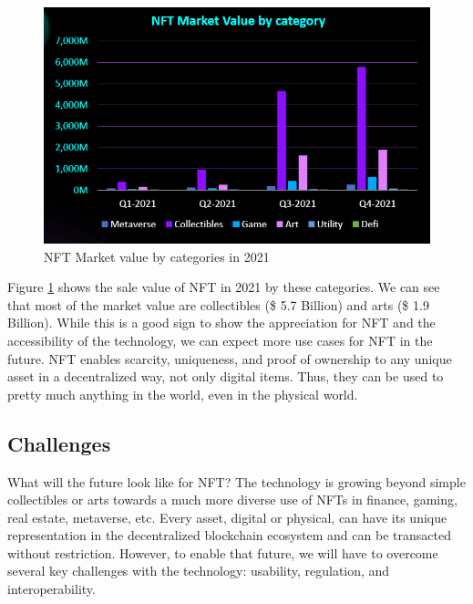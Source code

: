 \documentclass[12pt]{article}
\begin{document}
\begin{figure}[ht]
\label{fig:nftsale}
\includegraphics[width=14cm]{img/nftchart.png}
\centering
\caption{NFT Market value by categories in 2021 \cite{nftsale}}
\end{figure}

Figure \ref{fig:nftsale} shows the sale value of NFT in 2021 by these categories. We can see that most of the market value are collectibles (\$ 5.7 Billion) and arts (\$ 1.9 Billion). While this is a good sign to show the appreciation for NFT and the accessibility of the technology, we can expect more use cases for NFT in the future. NFT enables scarcity, uniqueness, and proof of ownership to any unique asset in a decentralized way, not only digital items. Thus, they can be used to pretty much anything in the world, even in the physical world. 

\subsection{Challenges}
What will the future look like for NFT? The technology is growing beyond simple collectibles or arts towards a much more diverse use of NFTs in finance, gaming, real estate, metaverse, etc. Every asset, digital or physical, can have its unique representation in the decentralized blockchain ecosystem and can be transacted without restriction. However, to enable that future, we will have to overcome several key challenges with the technology: usability, regulation, and interoperability.
\end{document}
